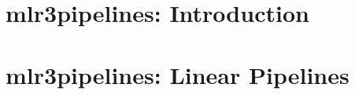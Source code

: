 \documentclass[11pt,compress,t,notes=noshow, xcolor=table]{beamer}
\begin{document}
\section{mlr3pipelines: Introduction}


%

%

\section{mlr3pipelines: Linear Pipelines}


\endlecture
\end{document}
